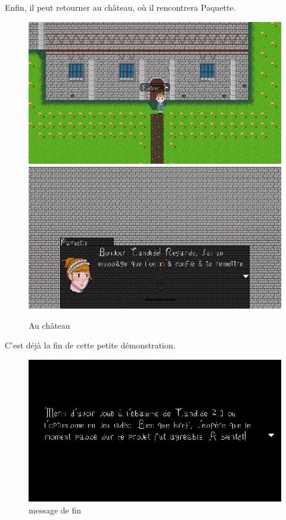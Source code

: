 \documentclass[11pt]{article}
\begin{document}
Enfin, il peut retourner au château, où il rencontrera Paquette.

\begin{figure}[H]
\includegraphics[scale=0.35]{gameplay9}
\includegraphics[scale=0.35]{gameplay11}
\centering
\caption{Au château}
\end{figure}

C'est déjà la fin de cette petite démonstration. 
\begin{figure}[H]
\includegraphics[scale=0.35]{gameplay12}
\centering
\caption{message de fin}
\end{figure}
\end{document}
